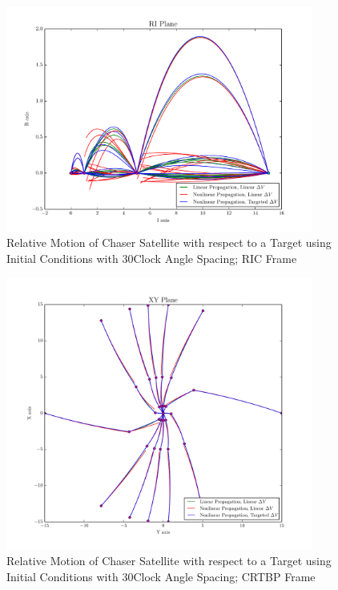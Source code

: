 \documentclass[a4paper]{article}
\begin{document}
\begin{figure}[h] \label{fig:RIC_2}
	\begin{center}
		\includegraphics[width=0.9\textwidth]{RIC_2}
		\caption{Relative Motion of Chaser Satellite with respect to a Target using Initial Conditions with 30\textdegree Clock Angle Spacing; RIC Frame}
	\end{center}
\end{figure}

\begin{figure}[h] \label{fig:RLP_2}
	\begin{center}
		\includegraphics[width=0.9\textwidth]{RLP_2}
		\caption{Relative Motion of Chaser Satellite with respect to a Target using Initial Conditions with 30\textdegree Clock Angle Spacing; CRTBP Frame}
	\end{center}
\end{figure}
\end{document}
